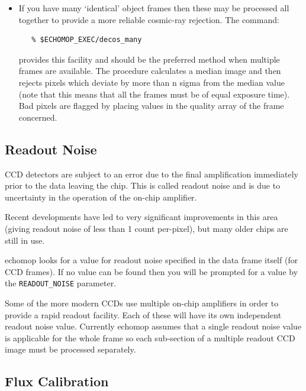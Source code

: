 \documentclass[11pt,twoside]{article}
\newcommand{\htmlref}[2]{#1}
\newcommand{\xlabel}[1]{}
\newcommand{\mlabel}[1]{\xlabel{#1}\label{#1}}
\newcommand{\myindex}[1]{\index{#1}}
\renewcommand{\myindex}[1]{}
\begin{document}
\begin{itemize}

\item If you have many `identical' object frames then these may be
      processed all together to provide a more reliable cosmic-ray
      rejection. The command:

\myindex{Multiple object frames}
\myindex{Cosmic rays!coincidence checking}

\begin{verbatim}
   % $ECHOMOP_EXEC/decos_many
\end{verbatim}

provides this facility and should be the preferred method when multiple
frames are available. The procedure calculates a median image and then
rejects pixels which deviate by more than n sigma from the median value
(note that this means that all the frames must be of equal exposure
time). Bad pixels are flagged by placing values in the quality array of
the frame concerned.

\end{itemize}


\subsection{\mlabel{readout_noise}Readout Noise}
\myindex{Readout noise}

CCD detectors are subject to an error due to the final amplification
immediately prior to the data leaving the chip. This is called readout
noise and is due to uncertainty in the operation of the on-chip
amplifier.

Recent developments have led to very significant improvements in this
area (giving readout noise of less than 1 count per-pixel),  but many
older chips are still in use.

{\sc echomop} looks for a value for readout noise specified in the data
frame itself (for CCD frames).  If no value can be found then you
will be prompted for a value by the
\htmlref{{\tt{READOUT\_NOISE}}}{par_READOUT_NOISE} parameter.

Some of the more modern CCDs use multiple on-chip amplifiers in order
to provide a rapid readout facility.  Each of these will have its own
independent readout noise value.  Currently {\sc echomop} assumes that a single
readout noise value is applicable for the whole frame so each sub-section
of a multiple readout CCD image must be processed separately.


\subsection{\mlabel{flux_calibration}Flux Calibration}
\myindex{Flux calibration}
\myindex{Flux standards}
\myindex{Standard stars}
\end{document}
